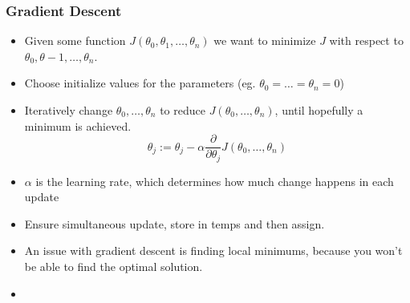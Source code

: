 \subsubsection{Gradient Descent}
\begin{itemize}[--]
	\item Given some function $J(\theta_0, \theta_1,\ldots ,\theta_n)$ we want to minimize $J$ with respect to $\theta_0, \theta-1,\ldots ,\theta_n$. 
	\item Choose initialize values for the parameters (eg. $\theta_0=\ldots=\theta_n =0$)
	\item Iteratively change $\theta_0, \ldots, \theta_n$ to reduce $J(\theta_0, \ldots, \theta_n )$, until hopefully a minimum is achieved.
	$$\theta_j := \theta_j - \alpha \frac{\partial}{\partial \theta_j}J(\theta_0,\ldots, \theta_n)$$
	\item $\alpha$ is the learning rate, which determines how much change happens in each update
 	\item Ensure simultaneous update, store in temps and then assign.
	\item An issue with gradient descent is finding local minimums, because you won't be able to find the optimal solution. 
	\item 
\end{itemize}

